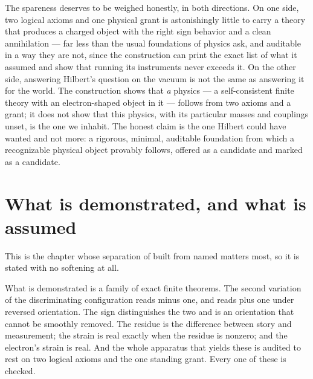 The spareness deserves to be weighed honestly, in both directions. On one side, two logical axioms and
one physical grant is astonishingly little to carry a theory that produces a charged object with the
right sign behavior and a clean annihilation --- far less than the usual foundations of physics ask, and
auditable in a way they are not, since the construction can print the exact list of what it assumed and
show that running its instruments never exceeds it. On the other side, answering Hilbert's question on
the vacuum is not the same as answering it for the world. The construction shows that \emph{a} physics
--- a self-consistent finite theory with an electron-shaped object in it --- follows from two axioms and
a grant; it does not show that this physics, with its particular masses and couplings unset, is the one
we inhabit. The honest claim is the one Hilbert could have wanted and not more: a rigorous, minimal,
auditable foundation from which a recognizable physical object provably follows, offered as a candidate
and marked as a candidate.

\section{What is demonstrated, and what is assumed}
\label{se:demonstrated-assumed-ch19}

This is the chapter whose separation of built from named matters most, so it is stated with no
softening at all.

What is demonstrated is a family of exact finite theorems. The second variation of the discriminating
configuration reads minus one, and reads plus one under reversed orientation. The sign distinguishes the
two and is an orientation that cannot be smoothly removed. The residue is the difference between story
and measurement; the strain is real exactly when the residue is nonzero; and the electron's strain is
real. And the whole apparatus that yields these is audited to rest on two logical axioms and the one
standing grant. Every one of these is checked.


